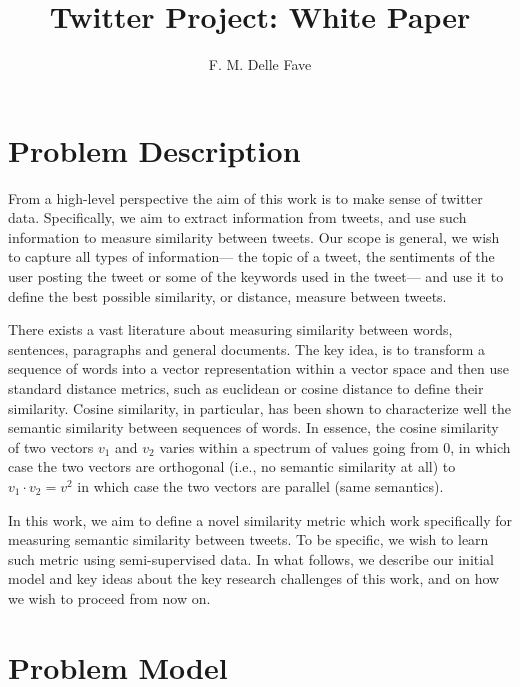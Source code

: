 \documentclass[letterpaper]{article}
\begin{document}
%
\title{Twitter Project: White Paper}
\author{F. M. Delle Fave
}
\maketitle

\section{Problem Description}

From a high-level perspective the aim of this work is to make sense of twitter data. Specifically, we aim to extract information from tweets, and use such information to measure similarity between tweets. Our scope is general, we wish to capture all types of information--- the topic of a tweet, the sentiments of the user posting the tweet or some of the keywords used in the tweet--- and use it to define the best possible similarity, or distance, measure between tweets.

There exists a vast literature about measuring similarity between words, sentences, paragraphs and general documents. The key idea, is to transform a sequence of words into a vector representation within a vector space and then use standard distance metrics, such as euclidean or cosine distance to define their similarity. Cosine similarity, in particular, has been shown to characterize well the semantic similarity between sequences of words. In essence, the cosine similarity of two vectors $v_1$ and $v_2$ varies within a spectrum of values going from $0$, in which case the two vectors are orthogonal (i.e., no semantic similarity at all) to $v_1 \cdot v_2 = v^2$ in which case the two vectors are parallel (same semantics). 

In this work, we aim to define a novel similarity metric which work specifically for measuring semantic similarity between tweets. To be specific, we wish to learn such metric using semi-supervised data. In what follows, we describe our initial model and key ideas about the key research challenges of this work, and on how we wish to proceed from now on. 

\section{Problem Model}
\end{document}

